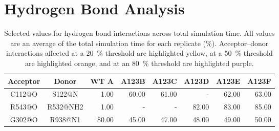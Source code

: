 \documentclass[12pt]{article}
\begin{document}
\pagebreak

\section{Hydrogen Bond Analysis}

\begin{table}[htb!]
    \caption{Selected values for hydrogen bond interactions across total simulation time. All values are an average of the total simulation time for each replicate (\si{\percent}). Acceptor--donor interactions affected at a \SI{20}{\percent} threshold are highlighted yellow, at a \SI{50}{\percent} threshold are highlighted orange, and at an \SI{80}{\percent} threshold are highlighted purple.}
    \label{tab:HBA}
    \centering
    \begin{tabular}{|c|c|r|r|r|r|r|r|}
    \hline
Acceptor    & Donor     & WT A & A123B & A123C & A123D & A123E & A123F\\ \hline
%
\rowcolor{PaleOrange}
C112@O	& S122@N	& 1.00  & 60.00 	& 61.00 	& -     	& 62.00	& 63.00 \\
%
\rowcolor{PalePurple}
R543@O	& R532@NH2	& 1.00  & -		& - 		& 82.00	& 83.00	& 85.00 \\
% 
\rowcolor{PaleYellow}
G302@O	& R938@N1	& 80.00  & 45.00	& 47.00	& 48.00	& 49.00	& 50.00 \\ \hline
    \end{tabular}
\end{table}




\end{document}
